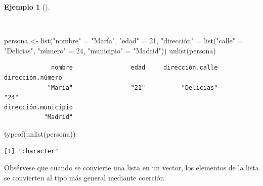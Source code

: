 \documentclass[
  a4paper,
]{scrreport}
\newenvironment{Shaded}{\begin{snugshade}}{\end{snugshade}}
\newcommand{\DecValTok}[1]{\textcolor[rgb]{0.68,0.00,0.00}{#1}}
\newcommand{\FunctionTok}[1]{\textcolor[rgb]{0.28,0.35,0.67}{#1}}
\newcommand{\NormalTok}[1]{\textcolor[rgb]{0.00,0.23,0.31}{#1}}
\newcommand{\OtherTok}[1]{\textcolor[rgb]{0.00,0.23,0.31}{#1}}
\newcommand{\StringTok}[1]{\textcolor[rgb]{0.13,0.47,0.30}{#1}}
\theoremstyle{definition}
\theoremstyle{definition}
\newtheorem{example}{Ejemplo}[chapter]
\theoremstyle{remark}
\begin{document}
\begin{example}[]\protect\hypertarget{exm-aplanar-lista}{}\label{exm-aplanar-lista}

~

\begin{Shaded}
\begin{Highlighting}[]
\NormalTok{persona }\OtherTok{\textless{}{-}} \FunctionTok{list}\NormalTok{(}\StringTok{"nombre"} \OtherTok{=} \StringTok{"María"}\NormalTok{, }\StringTok{"edad"} \OtherTok{=} \DecValTok{21}\NormalTok{, }\StringTok{"dirección"} \OtherTok{=} \FunctionTok{list}\NormalTok{(}\StringTok{"calle"} \OtherTok{=} \StringTok{"Delicias"}\NormalTok{, }\StringTok{"número"} \OtherTok{=} \DecValTok{24}\NormalTok{, }\StringTok{"municipio"} \OtherTok{=} \StringTok{"Madrid"}\NormalTok{))}
\FunctionTok{unlist}\NormalTok{(persona)}
\end{Highlighting}
\end{Shaded}

\begin{verbatim}
             nombre                edad     dirección.calle    dirección.número 
            "María"                "21"          "Delicias"                "24" 
dirección.municipio 
           "Madrid" 
\end{verbatim}

\begin{Shaded}
\begin{Highlighting}[]
\FunctionTok{typeof}\NormalTok{(}\FunctionTok{unlist}\NormalTok{(persona))}
\end{Highlighting}
\end{Shaded}

\begin{verbatim}
[1] "character"
\end{verbatim}

\end{example}

\begin{tcolorbox}[enhanced jigsaw, title=\textcolor{quarto-callout-warning-color}{\faExclamationTriangle}\hspace{0.5em}{Advertencia}, titlerule=0mm, toprule=.15mm, colbacktitle=quarto-callout-warning-color!10!white, arc=.35mm, colframe=quarto-callout-warning-color-frame, opacitybacktitle=0.6, coltitle=black, left=2mm, colback=white, opacityback=0, breakable, bottomrule=.15mm, toptitle=1mm, leftrule=.75mm, bottomtitle=1mm, rightrule=.15mm]

Obsérvese que cuando se convierte una lista en un vector, los elementos
de la lista se convierten al tipo más general mediante coerción.

\end{tcolorbox}
\end{document}
